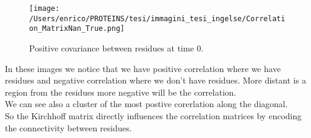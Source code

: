 \documentclass[English, Lau, oneside]{sapthesis}
\begin{document}
\begin{figure}[h!]
    \centering
    \texttt{[image: /Users/enrico/PROTEINS/tesi/immagini\_tesi\_ingelse/Correlation\_MatrixNan\_True.png]}
    \caption{Positive covariance between residues at time 0.}
    \label{fig:correlation_positive_figo}
\end{figure}
In these images we notice that we have positive correlation where we have residues and negative correlation where we don't have residues.
More distant is a region from the residues more negative will be the correlation.\\
We can see also a cluster of the most postive corerlation along the diagonal.\\
So the Kirchhoff matrix directly influences the correlation matrices by encoding the connectivity between residues. 

\newpage
\end{document}
